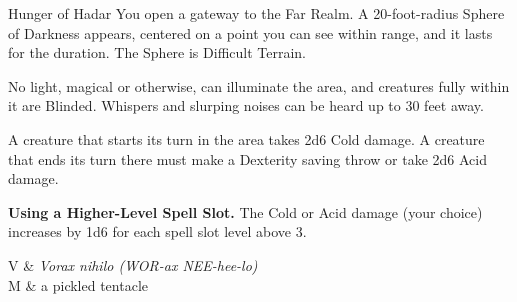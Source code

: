 \begin{Spell}[
  tags=Concentration,
  level={3rd},
  time={1 action},
  range={150 ft/20 ft r sphere},
  components={V, S, M},
  duration={1 minute},
  school={Conjuration},
  attack={DEX Save},
  effect={Damage, Control}
]{Hunger of Hadar}
You open a gateway to the Far Realm. A 20-foot-radius Sphere of Darkness appears, centered on a point you can see within range, and it lasts for the duration. The Sphere is Difficult Terrain.

No light, magical or otherwise, can illuminate the area, and creatures fully within it are Blinded. Whispers and slurping noises can be heard up to 30 feet away.

A creature that starts its turn in the area takes 2d6 Cold damage. A creature that ends its turn there must make a Dexterity saving throw or take 2d6 Acid damage.

\textbf{Using a Higher-Level Spell Slot.} The Cold or Acid damage (your choice) increases by 1d6 for each spell slot level above 3.

\begin{components}
V & \textit{Vorax nihilo (WOR-ax NEE-hee-lo)} \\
M & a pickled tentacle
\end{components}
\end{Spell}


